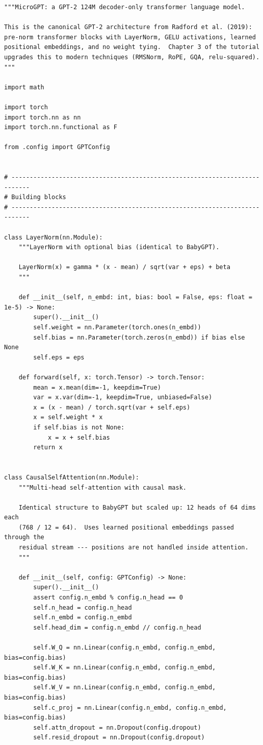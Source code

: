 \begin{lstlisting}
"""MicroGPT: a GPT-2 124M decoder-only transformer language model.

This is the canonical GPT-2 architecture from Radford et al. (2019):
pre-norm transformer blocks with LayerNorm, GELU activations, learned
positional embeddings, and no weight tying.  Chapter 3 of the tutorial
upgrades this to modern techniques (RMSNorm, RoPE, GQA, relu-squared).
"""

import math

import torch
import torch.nn as nn
import torch.nn.functional as F

from .config import GPTConfig


# ---------------------------------------------------------------------------
# Building blocks
# ---------------------------------------------------------------------------

class LayerNorm(nn.Module):
    """LayerNorm with optional bias (identical to BabyGPT).

    LayerNorm(x) = gamma * (x - mean) / sqrt(var + eps) + beta
    """

    def __init__(self, n_embd: int, bias: bool = False, eps: float = 1e-5) -> None:
        super().__init__()
        self.weight = nn.Parameter(torch.ones(n_embd))
        self.bias = nn.Parameter(torch.zeros(n_embd)) if bias else None
        self.eps = eps

    def forward(self, x: torch.Tensor) -> torch.Tensor:
        mean = x.mean(dim=-1, keepdim=True)
        var = x.var(dim=-1, keepdim=True, unbiased=False)
        x = (x - mean) / torch.sqrt(var + self.eps)
        x = self.weight * x
        if self.bias is not None:
            x = x + self.bias
        return x


class CausalSelfAttention(nn.Module):
    """Multi-head self-attention with causal mask.

    Identical structure to BabyGPT but scaled up: 12 heads of 64 dims each
    (768 / 12 = 64).  Uses learned positional embeddings passed through the
    residual stream --- positions are not handled inside attention.
    """

    def __init__(self, config: GPTConfig) -> None:
        super().__init__()
        assert config.n_embd % config.n_head == 0
        self.n_head = config.n_head
        self.n_embd = config.n_embd
        self.head_dim = config.n_embd // config.n_head

        self.W_Q = nn.Linear(config.n_embd, config.n_embd, bias=config.bias)
        self.W_K = nn.Linear(config.n_embd, config.n_embd, bias=config.bias)
        self.W_V = nn.Linear(config.n_embd, config.n_embd, bias=config.bias)
        self.c_proj = nn.Linear(config.n_embd, config.n_embd, bias=config.bias)
        self.attn_dropout = nn.Dropout(config.dropout)
        self.resid_dropout = nn.Dropout(config.dropout)


\end{lstlisting}

